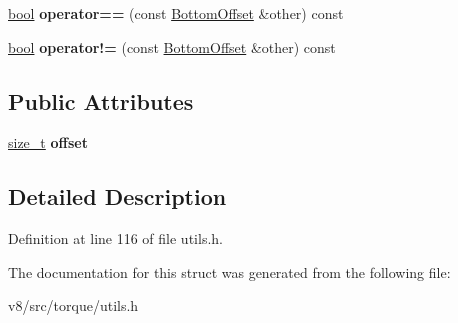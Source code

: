 \begin{DoxyCompactItemize}
\item 
\mbox{\label{structv8_1_1internal_1_1torque_1_1BottomOffset_a7d2b238ad3e93f7d519b2c9806804265}} 
\mbox{\hyperlink{classbool}{bool}} {\bfseries operator==} (const \mbox{\hyperlink{structv8_1_1internal_1_1torque_1_1BottomOffset}{Bottom\+Offset}} \&other) const
\item 
\mbox{\label{structv8_1_1internal_1_1torque_1_1BottomOffset_a885903c92122d1fd1ffdf4dd98759050}} 
\mbox{\hyperlink{classbool}{bool}} {\bfseries operator!=} (const \mbox{\hyperlink{structv8_1_1internal_1_1torque_1_1BottomOffset}{Bottom\+Offset}} \&other) const
\end{DoxyCompactItemize}
\subsection*{Public Attributes}
\begin{DoxyCompactItemize}
\item 
\mbox{\label{structv8_1_1internal_1_1torque_1_1BottomOffset_a379d783c4ea1895ca6f2e3fe589a8fe1}} 
\mbox{\hyperlink{classsize__t}{size\+\_\+t}} {\bfseries offset}
\end{DoxyCompactItemize}


\subsection{Detailed Description}


Definition at line 116 of file utils.\+h.



The documentation for this struct was generated from the following file\+:\begin{DoxyCompactItemize}
\item 
v8/src/torque/utils.\+h\end{DoxyCompactItemize}
